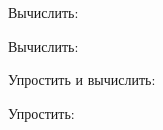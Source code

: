 \begin{listofex}
	\item Вычислить:
	\begin{enumcols}[itemcolumns=2]
		\item {}
		\item {}
		\item {}
		\item {}
	\end{enumcols}
	\item Вычислить:
	\begin{enumcols}[itemcolumns=2]
		\item {}
		\item {}
	\end{enumcols}
	\item Упростить и вычислить:
	\begin{enumcols}[itemcolumns=2]
		\item {}
		\item {}
		\item {}
	\end{enumcols}
	\item Упростить:
	\begin{enumcols}[itemcolumns=2]
		\item {}
		\item {}
	\end{enumcols}
	\item {}
	\item {}
\end{listofex}
